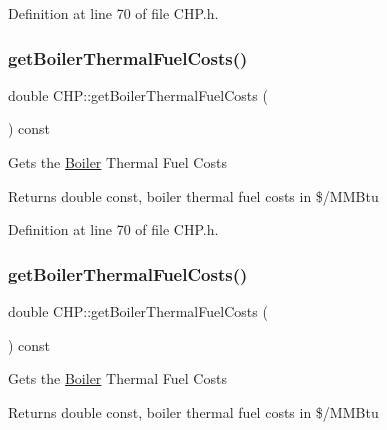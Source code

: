 Definition at line 70 of file C\+H\+P.\+h.

\mbox{\label{class_c_h_p_a9f6c6638b1be7c2df8ba4b406c3b2b94}} 
\subsubsection{\texorpdfstring{get\+Boiler\+Thermal\+Fuel\+Costs()}{getBoilerThermalFuelCosts()}\hspace{0.1cm}{\footnotesize\ttfamily [2/3]}}
{\footnotesize\ttfamily double C\+H\+P\+::get\+Boiler\+Thermal\+Fuel\+Costs (\begin{DoxyParamCaption}{ }\end{DoxyParamCaption}) const\hspace{0.3cm}{\ttfamily [inline]}}

Gets the \hyperlink{class_boiler}{Boiler} Thermal Fuel Costs

\begin{DoxyReturn}{Returns}
double const, boiler thermal fuel costs in \$/\+M\+M\+Btu 
\end{DoxyReturn}


Definition at line 70 of file C\+H\+P.\+h.

\mbox{\label{class_c_h_p_a9f6c6638b1be7c2df8ba4b406c3b2b94}} 
\subsubsection{\texorpdfstring{get\+Boiler\+Thermal\+Fuel\+Costs()}{getBoilerThermalFuelCosts()}\hspace{0.1cm}{\footnotesize\ttfamily [3/3]}}
{\footnotesize\ttfamily double C\+H\+P\+::get\+Boiler\+Thermal\+Fuel\+Costs (\begin{DoxyParamCaption}{ }\end{DoxyParamCaption}) const\hspace{0.3cm}{\ttfamily [inline]}}

Gets the \hyperlink{class_boiler}{Boiler} Thermal Fuel Costs

\begin{DoxyReturn}{Returns}
double const, boiler thermal fuel costs in \$/\+M\+M\+Btu 
\end{DoxyReturn}


